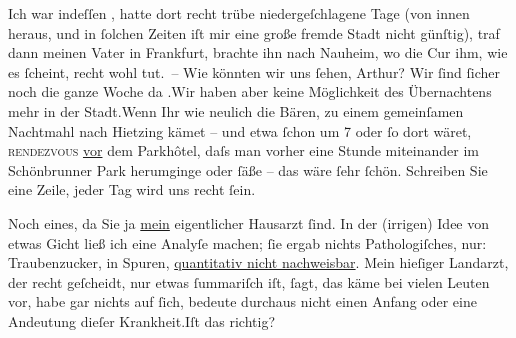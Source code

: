 \pstart
           Ich war indeſſen \label{K_L02182-2v}\label{K_L02182-2}, hatte dort recht trübe niedergeſchlagene Tage (von innen heraus,
               und in ſolchen Zeiten iſt mir eine große fremde Stadt nicht günſtig), traf dann
               meinen Vater in Frankfurt, brachte ihn nach Nauheim, wo die Cur ihm, wie es ſcheint, recht wohl tut. – Wie
                  {\pb}könnten wir uns ſehen, Arthur?
               Wir ſind ſicher noch die ganze Woche da \label{K_L02182-3v}\label{K_L02182-3}.\hspace*{1.5em}Wir haben aber keine Möglichkeit des Übernachtens mehr
               in der Stadt.\hspace*{1.5em}Wenn Ihr wie neulich die Bären, zu einem gemeinſamen Nachtmahl
               nach Hietzing kämet – und etwa ſchon um
                  7 oder ſo dort wäret, \textsc{rendezvous}{ }\uline{vor} dem Parkhôtel, daſs man {\pb}vorher
               eine Stunde miteinander im Schönbrunner Park
               herumginge oder ſäße – das wäre ſehr ſchön. Schreiben Sie eine Zeile, jeder Tag wird
               uns recht ſein.\pend
           
\pstart
           Noch eines, da Sie ja \uline{mein} eigentlicher Hausarzt
               ſind. In der (irrigen) Idee von etwas Gicht ließ ich eine Analyſe machen; ſie ergab
               nichts Pathologiſches, nur: Traubenzucker,  in
               Spuren, {\pb}\uline{quantitativ nicht nachweisbar}. Mein hieſiger Landarzt, der recht
               geſcheidt, nur etwas ſummariſch iſt, ſagt, das käme bei vielen Leuten vor, habe gar
               nichts auf ſich, bedeute durchaus nicht einen Anfang oder eine Andeutung dieſer
                  Krankheit.\hspace*{1.5em}Iſt das richtig?\pend
           
